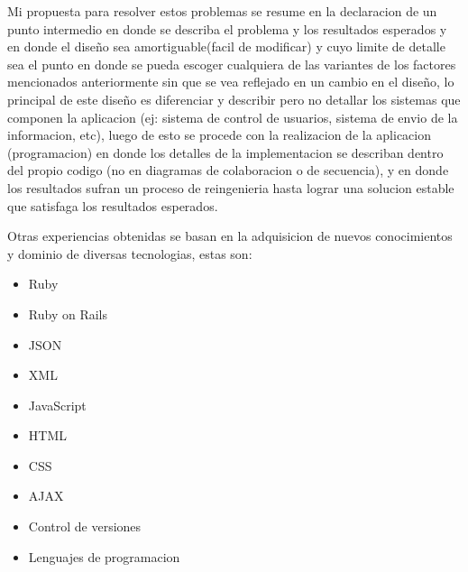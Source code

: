 Mi propuesta para resolver estos problemas se resume en la declaracion de un punto intermedio en donde se describa el problema y los resultados esperados y en donde el diseño sea amortiguable(facil de modificar) y cuyo limite de detalle sea el punto en donde se pueda escoger cualquiera de las variantes de los factores mencionados anteriormente sin que se vea reflejado en un cambio en el diseño, lo principal de este diseño es diferenciar y describir pero no detallar los sistemas que componen la aplicacion (ej: sistema de control de usuarios, sistema de envio de la informacion, etc), luego de esto se procede con la realizacion de la aplicacion (programacion) en donde los detalles de la implementacion se describan dentro del propio codigo (no en diagramas de colaboracion o de secuencia), y en donde los resultados sufran un proceso de reingenieria hasta lograr una solucion estable que satisfaga los resultados esperados.

Otras experiencias obtenidas se basan en la adquisicion de nuevos conocimientos y dominio de diversas tecnologias, estas son:

\begin{itemize}
	\item Ruby
	\item Ruby on Rails
	\item JSON
	\item XML
	\item JavaScript
	\item HTML
	\item CSS
	\item AJAX
	\item Control de versiones
	\item Lenguajes de programacion
\end{itemize}
